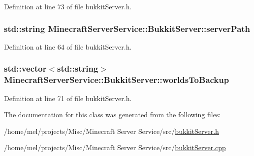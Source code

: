 Definition at line 73 of file bukkit\+Server.\+h.

\subsubsection[{\texorpdfstring{server\+Path}{serverPath}}]{\setlength{\rightskip}{0pt plus 5cm}std\+::string Minecraft\+Server\+Service\+::\+Bukkit\+Server\+::server\+Path\hspace{0.3cm}{\ttfamily [protected]}}\hypertarget{class_minecraft_server_service_1_1_bukkit_server_a670b58ed6f157e10f439fd8bd3554081}{}\label{class_minecraft_server_service_1_1_bukkit_server_a670b58ed6f157e10f439fd8bd3554081}


Definition at line 64 of file bukkit\+Server.\+h.

\subsubsection[{\texorpdfstring{worlds\+To\+Backup}{worldsToBackup}}]{\setlength{\rightskip}{0pt plus 5cm}std\+::vector$<$std\+::string$>$ Minecraft\+Server\+Service\+::\+Bukkit\+Server\+::worlds\+To\+Backup\hspace{0.3cm}{\ttfamily [protected]}}\hypertarget{class_minecraft_server_service_1_1_bukkit_server_ad4b403d728a418c62cbe1b2167a5c26c}{}\label{class_minecraft_server_service_1_1_bukkit_server_ad4b403d728a418c62cbe1b2167a5c26c}


Definition at line 71 of file bukkit\+Server.\+h.



The documentation for this class was generated from the following files\+:\begin{DoxyCompactItemize}
\item 
/home/mel/projects/\+Misc/\+Minecraft Server Service/src/\hyperlink{bukkit_server_8h}{bukkit\+Server.\+h}\item 
/home/mel/projects/\+Misc/\+Minecraft Server Service/src/\hyperlink{bukkit_server_8cpp}{bukkit\+Server.\+cpp}\end{DoxyCompactItemize}

